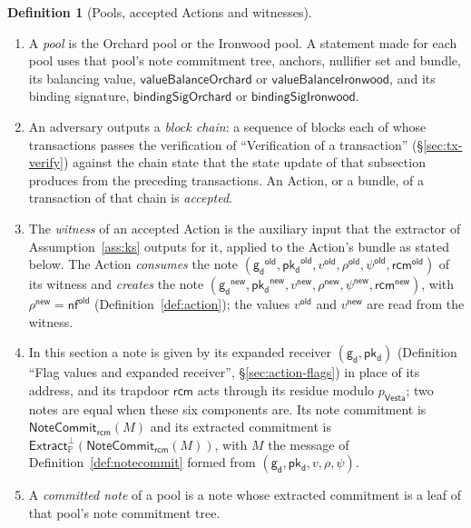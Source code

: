 \documentclass[11pt,a4paper]{article}
\theoremstyle{definition}
\newtheorem{definition}[theorem]{Definition}
\newcommand{\PP}{\mathbb{P}}
\newcommand{\nfsym}{\mathsf{nf}}
\newcommand{\Vesta}{\ensuremath{\mathsf{Vesta}}}
\newcommand{\NoteCommit}{\ensuremath{\mathsf{NoteCommit}}}
\newcommand{\Extract}{\ensuremath{\mathsf{Extract}}}
\newcommand{\pkd}{\ensuremath{\mathsf{pk_d}}}
\newcommand{\gd}{\ensuremath{\mathsf{g_d}}}
\newcommand{\rcm}{\ensuremath{\mathsf{rcm}}}
\begin{document}
\begin{definition}[Pools, accepted Actions and witnesses]
\leavevmode
\begin{enumerate}
\item[(a)] A \emph{pool} is the Orchard pool or the Ironwood pool. A
  statement made for each pool uses that pool's note commitment tree,
  anchors, nullifier set and bundle, its balancing value,
  $\mathsf{valueBalanceOrchard}$ or $\mathsf{valueBalanceIronwood}$, and its
  binding signature, $\mathsf{bindingSigOrchard}$ or
  $\mathsf{bindingSigIronwood}$.
\item[(b)] An adversary outputs a \emph{block chain}: a sequence of blocks
  each of whose transactions passes the verification of ``Verification of a
  transaction'' (\S\ref{sec:tx-verify}) against the chain state that the
  state update of that subsection produces from the preceding
  transactions. An Action, or a bundle, of a transaction of that chain is
  \emph{accepted}.
\item[(c)] The \emph{witness} of an accepted Action is the auxiliary input
  that the extractor of Assumption~\ref{ass:ks} outputs for it, applied to
  the Action's bundle as stated below. The Action \emph{consumes} the note
  $(\gd^{\mathsf{old}}, \pkd^{\mathsf{old}}, v^{\mathsf{old}},
  \rho^{\mathsf{old}}, \psi^{\mathsf{old}}, \rcm^{\mathsf{old}})$ of its
  witness and \emph{creates} the note $(\gd^{\mathsf{new}},
  \pkd^{\mathsf{new}}, v^{\mathsf{new}}, \rho^{\mathsf{new}},
  \psi^{\mathsf{new}}, \rcm^{\mathsf{new}})$, with $\rho^{\mathsf{new}} =
  \nfsym^{\mathsf{old}}$ (Definition~\ref{def:action}); the values
  $v^{\mathsf{old}}$ and $v^{\mathsf{new}}$ are read from the witness.
\item[(d)] In this section a note is given by its expanded receiver
  $(\gd, \pkd)$ (Definition ``Flag values and expanded receiver'',
  \S\ref{sec:action-flags}) in place of its address, and its trapdoor
  $\rcm$ acts through its residue modulo $p_{\Vesta}$; two notes are equal
  when these six components are. Its note commitment is
  $\NoteCommit_{\rcm}(M)$ and its extracted commitment is
  $\Extract_{\PP}^{\bot}(\NoteCommit_{\rcm}(M))$, with $M$ the message of
  Definition~\ref{def:notecommit} formed from $(\gd, \pkd, v, \rho, \psi)$.
\item[(e)] A \emph{committed note} of a pool is a note whose extracted
  commitment is a leaf of that pool's note commitment tree.
\end{enumerate}
\end{definition}
\end{document}
